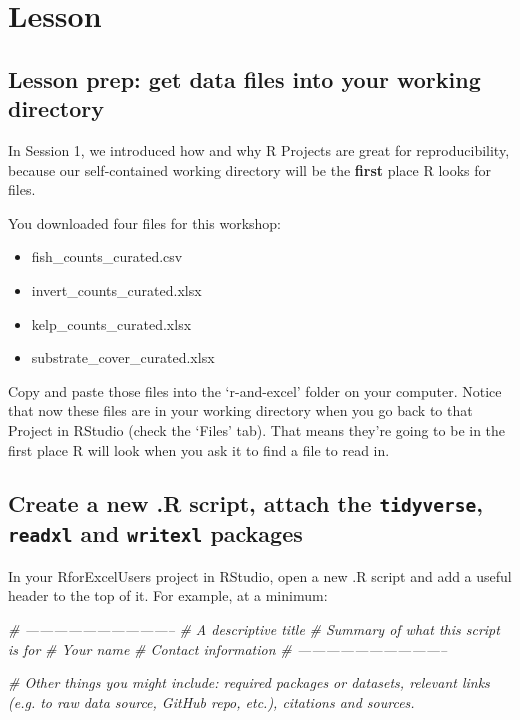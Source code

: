 \documentclass[]{book}
\newenvironment{Shaded}{\begin{snugshade}}{\end{snugshade}}
\newcommand{\CommentTok}[1]{\textcolor[rgb]{0.56,0.35,0.01}{\textit{#1}}}
\providecommand{\tightlist}{%
  \setlength{\itemsep}{0pt}\setlength{\parskip}{0pt}}
\begin{document}
\hypertarget{lesson}{%
\section{Lesson}\label{lesson}}

\hypertarget{lesson-prep-get-data-files-into-your-working-directory}{%
\subsection{Lesson prep: get data files into your working directory}\label{lesson-prep-get-data-files-into-your-working-directory}}

In Session 1, we introduced how and why R Projects are great for reproducibility, because our self-contained working directory will be the \textbf{first} place R looks for files.

You downloaded four files for this workshop:

\begin{itemize}
\tightlist
\item
  fish\_counts\_curated.csv
\item
  invert\_counts\_curated.xlsx
\item
  kelp\_counts\_curated.xlsx
\item
  substrate\_cover\_curated.xlsx
\end{itemize}

Copy and paste those files into the `r-and-excel' folder on your computer. Notice that now these files are in your working directory when you go back to that Project in RStudio (check the `Files' tab). That means they're going to be in the first place R will look when you ask it to find a file to read in.

\hypertarget{create-a-new-.r-script-attach-the-tidyverse-readxl-and-writexl-packages}{%
\subsection{\texorpdfstring{Create a new .R script, attach the \texttt{tidyverse}, \texttt{readxl} and \texttt{writexl} packages}{Create a new .R script, attach the tidyverse, readxl and writexl packages}}\label{create-a-new-.r-script-attach-the-tidyverse-readxl-and-writexl-packages}}

In your RforExcelUsers project in RStudio, open a new .R script and add a useful header to the top of it. For example, at a minimum:

\begin{Shaded}
\begin{Highlighting}[]
\CommentTok{# --------------------------------}
\CommentTok{# A descriptive title}
\CommentTok{# Summary of what this script is for }
\CommentTok{# Your name}
\CommentTok{# Contact information}
\CommentTok{# --------------------------------}

\CommentTok{# Other things you might include: required packages or datasets, relevant links (e.g. to raw data source, GitHub repo, etc.), citations and sources.}
\end{Highlighting}
\end{Shaded}
\end{document}
